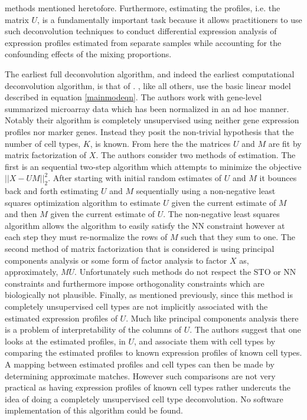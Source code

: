 \documentclass[reqno,12pt,oneside]{report}\usepackage[]{graphicx}\usepackage[]{color}
\theoremstyle{plain}
\theoremstyle{definition}
\theoremstyle{remark}
\numberwithin{theorem}{chapter}     %
\begin{document}
methods mentioned heretofore. Furthermore, estimating the profiles, i.e. the matrix $U$, is a fundamentally important task because it allows practitioners to use such deconvolution techniques to conduct differential expression analysis of expression profiles estimated from separate samples while accounting for the confounding effects of the mixing proportions. 

The earliest full deconvolution algorithm, and indeed the earliest computational deconvolution algorithm, is that of \cite{Venet2001}. \citeauthor{Venet2001}, like all others, use the basic linear model described in equation \ref{mainmodeqn}. The authors work with gene-level summarized microarray data which has been normalized in an ad hoc manner. Notably their algorithm is completely unsupervised using neither gene expression profiles nor marker genes. Instead they posit the non-trivial hypothesis that the number of cell types, $K$, is known. From here the the matrices $U$ and $M$ are fit by matrix factorization of $X$. The authors consider two methods of estimation. The first is an sequential two-step algorithm which attempts to minimize the objective $||X-UM||_2^2$. After starting with initial random estimates of $U$ and $M$ it bounces back and forth estimating $U$ and $M$ sequentially using a non-negative least squares optimization algorithm to estimate $U$ given the current estimate of $M$ and then $M$ given the current estimate of $U$. The non-negative least squares algorithm allows the algorithm to easily satisfy the NN constraint however at each step they must re-normalize the rows of $M$ such that they sum to one. The second method of matrix factorization that is considered is using principal components analysis or some form of factor analysis to factor $X$ as, approximately, $MU$. Unfortunately such methods do not respect the STO or NN constraints and furthermore impose orthogonality constraints which are biologically not plausible. Finally, as mentioned previously, since this method is completely unsupervised cell types are not implicitly associated with the estimated expression profiles of $U$. Much like principal components analysis there is a problem of interpretability of the columns of $U$. The authors suggest that one looks at the estimated profiles, in $U$, and associate them with cell types by comparing the estimated profiles to known expression profiles of known cell types. A mapping between estimated profiles and cell types can then be made by determining approximate matches. However such comparisons are not very practical as having expression profiles of known cell types rather undercuts the idea of doing a completely unsupervised cell type deconvolution. No software implementation of this algorithm could be found.
\end{document}
